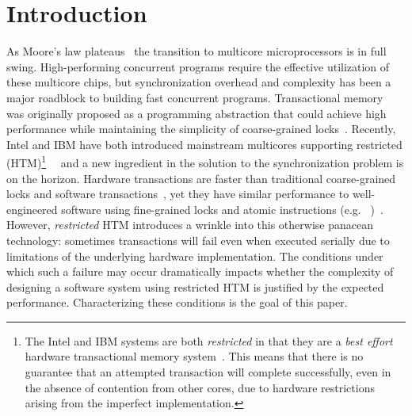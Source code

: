 \section{Introduction}




As Moore's law plateaus~\cite{Vardi14} the transition
to multicore microprocessors is in full swing. High-performing concurrent
programs require the effective utilization of these multicore chips, but 
synchronization overhead and complexity has been a
major roadblock to building fast concurrent programs.
Transactional memory~\cite{HerlihyMo93} was originally
proposed as a programming abstraction that could achieve
high performance while maintaining the simplicity of 
coarse-grained locks~\cite{YooHuLa13}.
Recently, Intel and IBM
have both introduced mainstream 
multicores supporting restricted  (HTM)\footnote{The Intel and IBM
systems are both \emph{restricted} in that they are 
a \emph{best effort} hardware transactional
memory system~\cite{YooHuLa13}.  This means that there is no 
guarantee that an attempted
transaction will complete successfully, even in the absence 
of contention from other cores, due to hardware restrictions
arising from the imperfect implementation.}~\cite{YooHuLa13}~\cite{LeGuWi15}
and a new ingredient in the solution 
to the synchronization problem is
on the horizon. Hardware transactions are faster than traditional
coarse-grained locks and software transactions~\cite{YooHuLa13}, 
yet they have similar performance to well-engineered software
using fine-grained locks and atomic instructions (e.g.
~\cite{Herlihy91})~\cite{YooHuLa13}. 
However, \emph{restricted} HTM introduces a wrinkle into 
this otherwise panacean technology: sometimes transactions
will fail even when executed serially due to limitations
of the underlying hardware implementation.  The conditions
under which such a failure may occur dramatically impacts
whether the complexity of designing a software system using restricted HTM
is justified by the expected performance.  Characterizing
these conditions is the goal of this paper. 

